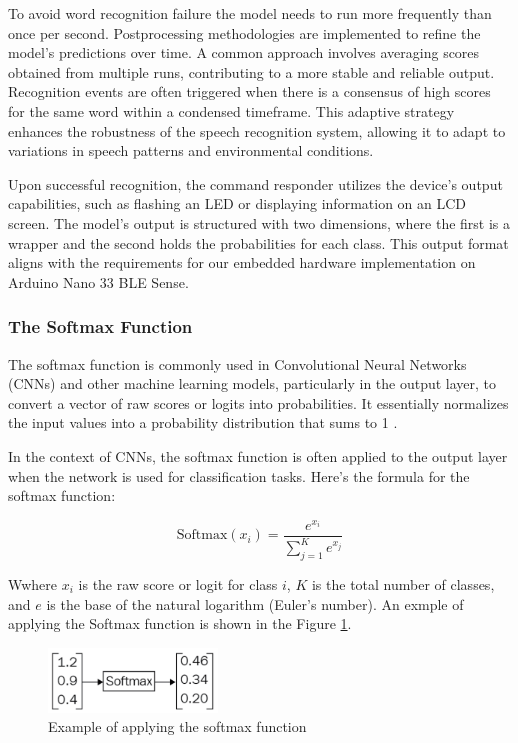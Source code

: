 To avoid word recognition failure the model needs to run more frequently than once per second. Postprocessing methodologies are implemented to refine the model's predictions over time. A common approach involves averaging scores obtained from multiple runs, contributing to a more stable and reliable output. Recognition events are often triggered when there is a consensus of high scores for the same word within a condensed timeframe. This adaptive strategy enhances the robustness of the speech recognition system, allowing it to adapt to variations in speech patterns and environmental conditions.

Upon successful recognition, the command responder utilizes the device's output capabilities, such as flashing an LED or displaying information on an LCD screen. The model's output is structured with two dimensions, where the first is a wrapper and the second holds the probabilities for each class. This output format aligns with the requirements for our embedded hardware implementation on Arduino Nano 33 BLE Sense.

\subsubsection{The Softmax Function}

The softmax function is commonly used in Convolutional Neural Networks (CNNs) and other machine learning models, particularly in the output layer, to convert a vector of raw scores or logits into probabilities. It essentially normalizes the input values into a probability distribution that sums to 1 \cite{Sewak:2018}.

In the context of CNNs, the softmax function is often applied to the output layer when the network is used for classification tasks. Here's the formula for the softmax function:

\begin{equation}
	\text{Softmax}(x_i) = \frac{e^{x_i}}{\sum_{j=1}^{K} e^{x_j}}
\end{equation}

Wwhere $x_i$ is the raw score or logit for class $i$, $K$ is the total number of classes, and $e$ is the base of the natural logarithm (Euler's number). An exmple of applying the Softmax function is shown in the Figure \ref{fig:softmax}.

\begin{figure}[h!]
	\centering
	\includegraphics[width=0.4\textwidth]{Images/DataMining/softmax}
	\caption{Example of applying the softmax function \cite{Sewak:2018}} \label{fig:softmax}
\end{figure}


